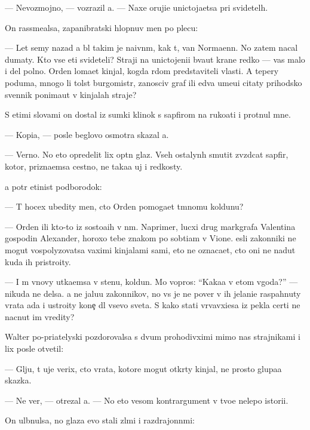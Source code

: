 \documentclass[10pt]{book}
\begin{document}
— Nevozmojno, — vozrazil {\y}a. — Naxe oruji{\y}e unictoja{\y}etsa pri svidetel{\ia}h.

On rassme{\y}alsa, zapanibratski hlopnuv men{\ia} po plecu:

— Let semy nazad {\y}a b{\yi}l takim je naivn{\yi}m, kak t{\yi}, van Normaenn. No zatem nacal dumaty. Kto vse eti svideteli? Straji na unictojeni{\y}i b{\yi}va{\y}ut kra{\y}ne redko — vas malo i del polno. Orden loma{\y}et kinjal, kogda r{\ia}dom predstaviteli vlasti. A tepery poduma{\y}, mnogo li tolst{\yi}{\y} burgomistr, zanosciv{\yi}{\y} graf ili {\y}edva ume{\y}u{\x}i{\y} citaty prihodsko{\y} sv{\ia}{\x}ennik ponima{\y}ut v kinjalah straje{\y}?

S etimi slovami on dostal iz sumki klinok s sapfirom na ruko{\y}ati i pro\-t{\ia}\-nul mne.

— Kopi{\y}a, — posle beglovo osmotra skazal {\y}a.

— Verno. No eto opredelit lix op{\yi}tn{\yi}{\y} glaz. Vseh ostalyn{\yi}h smutit zv{\e}zdcat{\yi}{\y} sapfir, kotor{\yi}{\y}, prizna{\y}emsa cestno, ne taka{\y}a uj i redkosty.

{\Y}a pot{\e}r {\x}etinist{\yi}{\y} podborodok:

— T{\yi} hocex ubedity men{\ia}, cto Orden pomoga{\y}et t{\e}mnomu koldunu?

— Orden ili kto-to iz sosto{\y}a{\x}ih v n{\e}m. Naprimer, lucxi{\y} drug markgrafa Valentina gospodin Alexander, horoxo tebe znakom{\yi}{\y} po sob{\yi}ti{\y}am v Vione. {\Y}esli zakonniki ne mogut vospolyzovatsa vaximi kinjalami sami, eto ne oznaca{\y}et, cto oni ne na{\y}dut kuda ih pristro{\y}ity.

— I m{\yi} vnovy ut{\yi}ka{\y}emsa v stenu, koldun. Mo{\y} vopros: ``Kaka{\y}a v etom v{\yi}\-go\-da?'' — nikuda ne delsa. {\Y}a ne jalu{\y}u zakonnikov, no vs{\e} je ne pover{\io} v ih jelani{\y}e raspahnuty vra\-ta ada i ustro{\y}ity kone{\c} dl{\ia} vsevo sveta. S kako{\y} stati v{\yi}rvavxi{\y}esa iz pekla certi ne nacnut im vredity?

Walter po-pri{\y}atelyski pozdorovalsa s dvum{\ia} prohodivximi mimo nas strajnikami i lix posle otvetil:

— Gl{\ia}ju, t{\yi} uje verix, cto vra\-ta, ko\-to\-r{\yi}\-{\y}e mogut otkr{\yi}ty kinjal{\yi}, ne prosto glupa{\y}a skazka.

— Ne ver{\io}, — otrezal {\y}a. — No eto vesom{\yi}{\y} kontrargument v tvo{\y}e{\y} nelepo{\y} istori{\y}i.

On ul{\yi}bnulsa, no glaza {\y}evo stali zl{\yi}mi i razdrajonn{\yi}mi:
\end{document}
